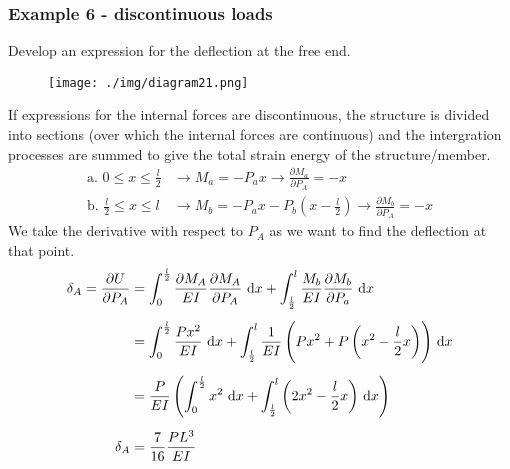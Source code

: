 \subsubsection{Example 6 - discontinuous loads}
Develop an expression for the deflection at the free end.
\begin{figure}[H]
  \centering
  \texttt{[image: ./img/diagram21.png]}
  \caption{}
\end{figure}
If expressions for the internal forces are discontinuous, the structure is divided into sections (over which the internal forces are continuous) and the intergration processes are summed to give the total strain energy of the structure/member.
\begin{align}
  \textrm{a. } 0 \leq x \leq \frac{l}{2} & \rightarrow M_a = -P_a x \rightarrow \frac{\partial M_a}{\partial P_A} = -x                                  \\
  \textrm{b. } \frac{l}{2} \leq x \leq l & \rightarrow M_b = -P_a x - P_b \left(x-\frac{l}{2}\right) \rightarrow \frac{\partial M_b}{\partial P_A} = -x
\end{align}
We take the derivative with respect to $P_A$ as we want to find the deflection at that point.
\begin{align}
  \delta_A = \frac{\partial U}{\partial P_A} & = \int_0^{\frac{l}{2}} \frac{\partial M_A}{EI} \frac{\partial M_A}{\partial P_A} \, \dif x + \int_{\frac{l}{2}}^l \frac{M_b}{EI} \frac{\partial M_b}{\partial P_a} \, \dif x \\[5pt]
                                             & = \int_0^{\frac{l}{2}} \frac{Px^2}{EI}\, \dif x + \int_{\frac{l}{2}}^l \frac{1}{EI}\left(Px^2 + P\left(x^2-\frac{l}{2}x\right)\right)\, \dif x                               \\[5pt]
                                             & = \frac{P}{EI}\left(\int_0^{\frac{l}{2}}x^2\,\dif x +\int_{\frac{l}{2}}^l \left(2x^2-\frac{l}{2}x\right)\, \dif x \right)                                                    \\[5pt]
  \delta_A                                   & = \frac{7}{16} \frac{PL^3}{EI}
\end{align}
